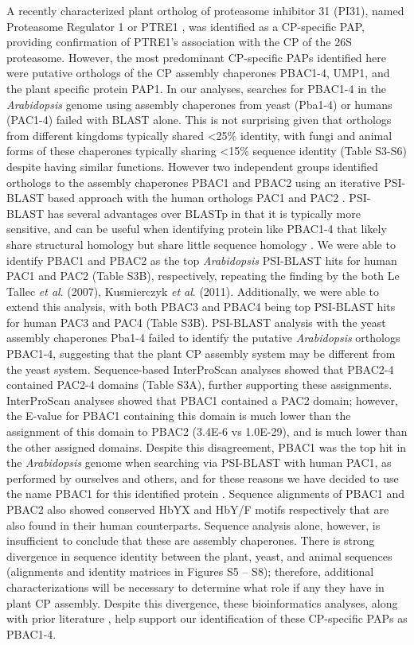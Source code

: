 A recently characterized plant ortholog of proteasome inhibitor 31 (PI31), named Proteasome Regulator 1 or PTRE1 \citep{yang16}, was identified as a CP-specific PAP, providing confirmation of PTRE1’s association with the CP of the 26S proteasome. However, the most predominant CP-specific PAPs identified here were putative orthologs of the CP assembly chaperones PBAC1-4, UMP1, and the plant specific protein PAP1. In our analyses, searches for PBAC1-4 in the \textit{Arabidopsis} genome using assembly chaperones from yeast (Pba1-4) or humans (PAC1-4) failed with BLAST alone. This is not surprising given that orthologs from different kingdoms typically shared <25\% identity, with fungi and animal forms of these chaperones typically sharing <15\% sequence identity (Table S3-S6) despite having similar functions. However two independent groups identified orthologs to the assembly chaperones PBAC1 and PBAC2 using an iterative PSI-BLAST based approach with the human orthologs PAC1 and PAC2 \citep{kusmierczyk11, le07}. PSI-BLAST has several advantages over BLASTp in that it is typically more sensitive, and can be useful when identifying protein like PBAC1-4 that likely share structural homology but share little sequence homology \citep{altschul97, aravind99, kusmierczyk11, yashiroda08}. We were able to identify PBAC1 and PBAC2 as the top \textit{Arabidopsis} PSI-BLAST hits for human PAC1 and PAC2 (Table S3B), respectively, repeating the finding by the both Le Tallec \textit{et al}. (2007), Kusmierczyk \textit{et al}. (2011). Additionally, we were able to extend this analysis, with both PBAC3 and PBAC4 being top PSI-BLAST hits for human PAC3 and PAC4 (Table S3B). PSI-BLAST analysis with the yeast assembly chaperones Pba1-4 failed to identify the putative \textit{Arabidopsis} orthologs PBAC1-4, suggesting that the plant CP assembly system may be different from the yeast system. Sequence-based InterProScan analyses showed that PBAC2-4 contained PAC2-4 domains (Table S3A), further supporting these assignments. InterProScan analyses showed that PBAC1 contained a PAC2 domain; however, the E-value for PBAC1 containing this domain is much lower than the assignment of this domain to PBAC2 (3.4E-6 vs 1.0E-29), and is much lower than the other assigned domains. Despite this disagreement, PBAC1 was the top hit in the \textit{Arabidopsis} genome when searching via PSI-BLAST with human PAC1, as performed by ourselves and others, and for these reasons we have decided to use the name PBAC1 for this identified protein \citep{kusmierczyk11, le07}. Sequence alignments of PBAC1 and PBAC2 also showed conserved HbYX and HbY/F motifs respectively that are also found in their human counterparts. Sequence analysis alone, however, is insufficient to conclude that these are assembly chaperones. There is strong divergence in sequence identity between the plant, yeast, and animal sequences (alignments and identity matrices in Figures S5 – S8); therefore, additional characterizations will be necessary to determine what role if any they have in plant CP assembly. Despite this divergence, these bioinformatics analyses, along with prior literature \citep{kusmierczyk11, le07}, help support our identification of these CP-specific PAPs as PBAC1-4.
